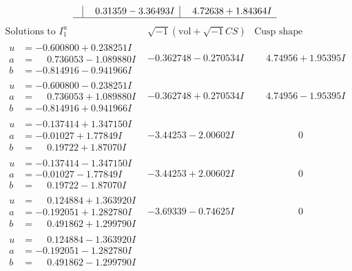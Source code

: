 \documentclass[1p]{elsarticle_modified}
\theoremstyle{definition}
\newcommand{\I}{\sqrt{-1}}
\begin{document}
$$\begin{array}{c|c|c}
 & \phantom{-}0.31359 - 3.36493 I & \phantom{-}4.72638 + 1.84364 I\\
 \hline 
 \end{array}$$\newpage$$\begin{array}{c|c|c}  
\text{Solutions to }I^u_{1}& \I (\text{vol} + \sqrt{-1}CS) & \text{Cusp shape}\\
 \hline 
\begin{aligned}
u &= -0.600800 + 0.238251 I \\
a &= \phantom{-}0.736053 - 1.089880 I \\
b &= -0.814916 - 0.941966 I\end{aligned}
 & -0.362748 - 0.270534 I & \phantom{-}4.74956 + 1.95395 I \\ \hline\begin{aligned}
u &= -0.600800 - 0.238251 I \\
a &= \phantom{-}0.736053 + 1.089880 I \\
b &= -0.814916 + 0.941966 I\end{aligned}
 & -0.362748 + 0.270534 I & \phantom{-}4.74956 - 1.95395 I \\ \hline\begin{aligned}
u &= -0.137414 + 1.347150 I \\
a &= -0.01027 + 1.77849 I \\
b &= \phantom{-}0.19722 + 1.87070 I\end{aligned}
 & -3.44253 - 2.00602 I & \phantom{-0.000000 } 0 \\ \hline\begin{aligned}
u &= -0.137414 - 1.347150 I \\
a &= -0.01027 - 1.77849 I \\
b &= \phantom{-}0.19722 - 1.87070 I\end{aligned}
 & -3.44253 + 2.00602 I & \phantom{-0.000000 } 0 \\ \hline\begin{aligned}
u &= \phantom{-}0.124884 + 1.363920 I \\
a &= -0.192051 + 1.282780 I \\
b &= \phantom{-}0.491862 + 1.299790 I\end{aligned}
 & -3.69339 - 0.74625 I & \phantom{-0.000000 } 0 \\ \hline\begin{aligned}
u &= \phantom{-}0.124884 - 1.363920 I \\
a &= -0.192051 - 1.282780 I \\
b &= \phantom{-}0.491862 - 1.299790 I\end{aligned}

\end{array}$$
\end{document}
